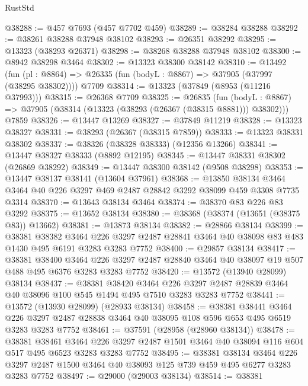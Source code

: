 \begin{lexlean}{RustStd}
\begin{coremodule}
@38288 := @457 @7693 (@457 @7702 @459)
@38289 := @38284 @38288
@38292 := @38261 @38288 @37948 @38102
@38293 := @26351 @38292
@38295 := @13323 (@38293 @26371)
@38298 := @38268 @38288 @37948 @38102
@38300 := @8942 @38298 @3464
@38302 := @13323 @38300 @38142
@38310 := @13492
    (fun (pl : @8864) => @26335 (fun (bodyL : @8867) => @37905 (@37997 (@38295 @38302))))
    @7709
@38314 := @13323 (@37849 (@8953 (@11216 @37993)))
@38315 := @26368 @7709
@38325 := @26835
    (fun (bodyL : @8867) => @37905 (@38314 (@13323 (@38293 (@26367 (@38315 @8881))) @38302)))
    @7859
@38326 := @13447 @13269
@38327 := @37849 @11219
@38328 := @13323 @38327
@38331 := @38293 (@26367 (@38315 @7859))
@38333 := @13323 @38331 @38302
@38337 := @38326 (@38328 @38333) (@12356 @13266)
@38341 := @13447 @38327 @38333 (@8892 @12195)
@38345 := @13447 @38331 @38302 (@26869 @38292)
@38349 := @13447 @38300 @38142 (@9508 @38298)
@38353 := @13447 @38137 @38141 (@13604 @37961)
@38368 := @13850
    @38134
    @3464
    @3464
    @40
    @226
    @3297
    @469
    @2487
    @28842
    @3292
    @38099
    @459
    @3308
    @7735
    @3314
@38370 := @13643 @38134 @3464
@38374 := @38370 @83 @226 @83 @3292
@38375 := @13652 @38134
@38380 := @38368 (@38374 (@13651 (@38375 @83)) @13662)
@38381 := @13873 @38134
@38382 := @28866 @38134
@38399 := @38381
    @38382
    @3464
    @226
    @3297
    @2487
    @28841
    @3464
    @40
    @38098
    @83
    @483
    @1430
    @495
    @6191
    @3283
    @3283
    @7752
@38400 := @29857 @38134
@38417 := @38381
    @38400
    @3464
    @226
    @3297
    @2487
    @28840
    @3464
    @40
    @38097
    @19
    @507
    @488
    @495
    @6376
    @3283
    @3283
    @7752
@38420 := @13572 (@13940 @28099) @38134
@38437 := @38381
    @38420
    @3464
    @226
    @3297
    @2487
    @28839
    @3464
    @40
    @38096
    @100
    @545
    @1494
    @495
    @7510
    @3283
    @3283
    @7752
@38441 := @13572 (@13930 @28099) (@28933 @38134)
@38458 := @38381
    @38441
    @3464
    @226
    @3297
    @2487
    @28838
    @3464
    @40
    @38095
    @108
    @596
    @653
    @495
    @6519
    @3283
    @3283
    @7752
@38461 := @37591 (@28958 (@28960 @38134))
@38478 := @38381
    @38461
    @3464
    @226
    @3297
    @2487
    @1501
    @3464
    @40
    @38094
    @116
    @604
    @517
    @495
    @6523
    @3283
    @3283
    @7752
@38495 := @38381
    @38134
    @3464
    @226
    @3297
    @2487
    @1500
    @3464
    @40
    @38093
    @125
    @739
    @459
    @495
    @6277
    @3283
    @3283
    @7752
@38497 := @29000 (@29003 @38134)
@38514 := @38381

\end{coremodule}
\end{lexlean}

